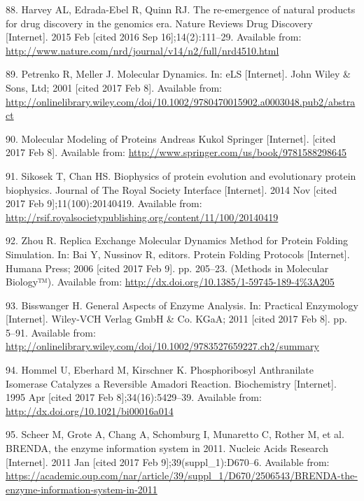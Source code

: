 \documentclass[12pt,twoside]{reedthesis}
\begin{document}
  \hypertarget{ref-harvey_re-emergence_2015}{}
  88. Harvey AL, Edrada-Ebel R, Quinn RJ. The re-emergence of natural
  products for drug discovery in the genomics era. Nature Reviews Drug
  Discovery {[}Internet{]}. 2015 Feb {[}cited 2016 Sep
  16{]};14(2):111--29. Available from:
  \url{http://www.nature.com/nrd/journal/v14/n2/full/nrd4510.html}
  
  \hypertarget{ref-petrenko_molecular_2001}{}
  89. Petrenko R, Meller J. Molecular Dynamics. In: eLS {[}Internet{]}.
  John Wiley \& Sons, Ltd; 2001 {[}cited 2017 Feb 8{]}. Available from:
  \url{http://onlinelibrary.wiley.com/doi/10.1002/9780470015902.a0003048.pub2/abstract}
  
  \hypertarget{ref-kukol_molecular_2008}{}
  90. Molecular Modeling of Proteins Andreas Kukol Springer
  {[}Internet{]}. {[}cited 2017 Feb 8{]}. Available from:
  \url{http://www.springer.com/us/book/9781588298645}
  
  \hypertarget{ref-sikosek_biophysics_2014}{}
  91. Sikosek T, Chan HS. Biophysics of protein evolution and evolutionary
  protein biophysics. Journal of The Royal Society Interface
  {[}Internet{]}. 2014 Nov {[}cited 2017 Feb 9{]};11(100):20140419.
  Available from:
  \url{http://rsif.royalsocietypublishing.org/content/11/100/20140419}
  
  \hypertarget{ref-bai_replica_2006}{}
  92. Zhou R. Replica Exchange Molecular Dynamics Method for Protein
  Folding Simulation. In: Bai Y, Nussinov R, editors. Protein Folding
  Protocols {[}Internet{]}. Humana Press; 2006 {[}cited 2017 Feb 9{]}. pp.
  205--23. (Methods in Molecular Biology™). Available from:
  \url{http://dx.doi.org/10.1385/1-59745-189-4\%3A205}
  
  \hypertarget{ref-bisswanger_general_2011}{}
  93. Bisswanger H. General Aspects of Enzyme Analysis. In: Practical
  Enzymology {[}Internet{]}. Wiley-VCH Verlag GmbH \& Co. KGaA; 2011
  {[}cited 2017 Feb 8{]}. pp. 5--91. Available from:
  \url{http://onlinelibrary.wiley.com/doi/10.1002/9783527659227.ch2/summary}
  
  \hypertarget{ref-hommel_phosphoribosyl_1995}{}
  94. Hommel U, Eberhard M, Kirschner K. Phosphoribosyl Anthranilate
  Isomerase Catalyzes a Reversible Amadori Reaction. Biochemistry
  {[}Internet{]}. 1995 Apr {[}cited 2017 Feb 8{]};34(16):5429--39.
  Available from: \url{http://dx.doi.org/10.1021/bi00016a014}
  
  \hypertarget{ref-scheer_brenda_2011}{}
  95. Scheer M, Grote A, Chang A, Schomburg I, Munaretto C, Rother M, et
  al. BRENDA, the enzyme information system in 2011. Nucleic Acids
  Research {[}Internet{]}. 2011 Jan {[}cited 2017 Feb
  9{]};39(suppl\_1):D670--6. Available from:
  \url{https://academic.oup.com/nar/article/39/suppl_1/D670/2506543/BRENDA-the-enzyme-information-system-in-2011}
  
\end{document}

